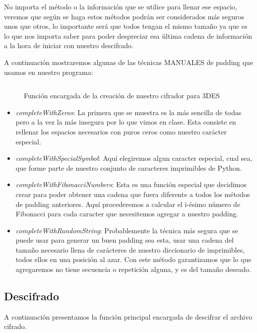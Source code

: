 \documentclass[10pt]{article}
\begin{document}
   		No importa el método o la información que se utilice para llenar ese espacio, veremos que según se haga estos métodos podrán ser considerados más seguros unos que otros, lo importante será que todos tengan el mismo tamaño ya que es lo que nos importa saber para poder despreciar esa última cadena de información a la hora de iniciar con nuestro descifrado.

   		A continuación mostraremos algunas de las técnicas MANUALES de padding que usamos en nuestro programa:

   		\begin{figure}[H]
			\inputminted[linenos, firstnumber=1, breaklines, tabsize=4, firstline=43, lastline=70]{python}{code/App.py}
			\caption{Función encargada de la creación de nuestro cifrador para 3DES}
		\end{figure}

		\begin{itemize}
			\item \textit{completeWithZeros}: La primera que se muestra es la más sencilla de todas pero a la vez la más insegura por lo que vimos en clase. Esta consiste en rellenar los espacios necesarios con puros ceros como nuestro carácter especial.
			
			\item \textit{completeWithSpecialSymbol}: Aquí elegiremos algun caracter especial, cual sea, que forme parte de nuestro conjunto de caracteres imprimibles de Python.
			
			\item \textit{completeWithFibonacciNumbers}: Esta es una función especial que decidimos crear para poder obtener una cadena que fuera diferente a todos los métodos de padding anteriores. Aquí procederemos a calcular el i-ésimo número de Fibonacci para cada caracter que necesitemos agregar a nuestro padding. 
			
			\item \textit{completeWithRandomString}: Probablemente la técnica más segura que se puede usar para generar un buen padding sea esta, usar una cadena del tamaño necesario llena de carácteres de nuestro diccionario de imprimibles, todos ellos en una posición al azar. Con este método garantizamos que lo que agregaremos no tiene secuencia o repetición alguna, y es del tamaño deseado.
		\end{itemize}
		
   	\subsection{Descifrado}
   		A continuación presentamos la función principal encargada de descifrar el archivo cifrado.
\end{document}

